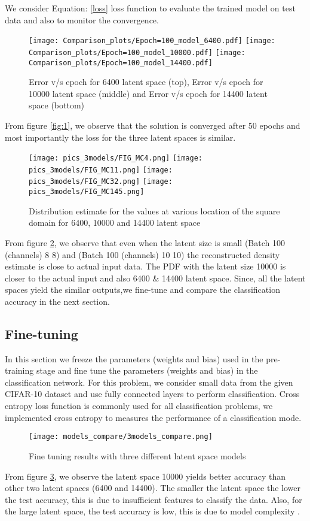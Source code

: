 \documentclass[sigconf, authorversion]{acmart}
\begin{document}
We consider Equation: \ref{loss} loss function to evaluate the trained model on test data and also to monitor the convergence.  
\begin{figure}[]
    \centering
    \texttt{[image: Comparison\_plots/Epoch=100\_model\_6400.pdf]}
    \texttt{[image: Comparison\_plots/Epoch=100\_model\_10000.pdf]}
    \texttt{[image: Comparison\_plots/Epoch=100\_model\_14400.pdf]}
    \caption{Error v/s epoch for 6400 latent space (top),  Error v/s epoch for 10000 latent space (middle) and Error v/s epoch for 14400 latent space (bottom)} \label{fig:3}
\end{figure} 

From figure \ref{fig:1}, we observe that the solution is converged after 50 epochs and most importantly the loss for the three latent spaces is similar.

\begin{figure}[]
    \centering
    \texttt{[image: pics\_3models/FIG\_MC4.png]}
    \texttt{[image: pics\_3models/FIG\_MC11.png]}
     \texttt{[image: pics\_3models/FIG\_MC32.png]}
    \texttt{[image: pics\_3models/FIG\_MC145.png]}
    \caption{Distribution estimate for the values at various location of the square domain for 6400, 10000 and 14400 latent space} \label{fig:2}
\end{figure} 

From figure \ref{fig:2}, we observe that even when the latent size is small (Batch  100 (channels)  8  8) and (Batch  100 (channels)  10  10) the reconstructed density estimate is close to actual input data. The PDF with the latent size 10000 is closer to the actual input and also 6400 \& 14400 latent space. Since, all the latent spaces yield the similar outputs,we fine-tune and compare the classification accuracy in the next section.
\subsection{Fine-tuning}
In this section we freeze the parameters (weights and bias) used in the pre-training stage and fine tune the parameters (weights and bias) in the classification network. For this problem, we consider small data from the given CIFAR-10 dataset and use fully connected layers to perform classification. Cross entropy loss function is commonly used for all classification problems, we implemented cross entropy to measures the performance of a classification mode. 
\begin{figure}
    \centering
    \texttt{[image: models\_compare/3models\_compare.png]}
    \caption{Fine tuning results with three different latent space models}
    \label{fig:reg}
\end{figure}
From figure \ref{fig:reg}, we observe the latent space 10000 yields better accuracy than other two latent spaces (6400 and 14400). The smaller the latent space the lower the test accuracy, this is due to insufficient features to classify the data. Also, for the large latent space, the test accuracy is low, this is due to model complexity \cite{goodfellow2016deep}.
\end{document}
